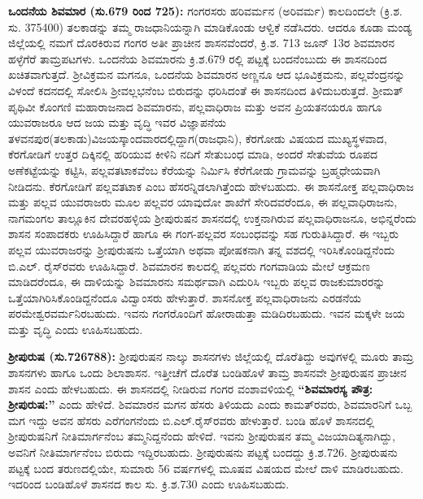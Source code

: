 \textbf{ ಒಂದನೆಯ ಶಿವಮಾರ (ಸು.679 ರಿಂದ 725): }ಗಂಗರಸರು ಹರಿವರ್ಮನ (ಅರಿವರ್ಮ) ಕಾಲದಿಂದಲೇ (ಕ್ರಿ.ಶ. ಸು. 375\enginline{-}400) ತಲಕಾಡನ್ನು ತಮ್ಮ ರಾಜಧಾನಿಯನ್ನಾಗಿ ಮಾಡಿಕೊಂಡು ಆಳ್ವಿಕೆ ನಡೆಸಿದರು. ಆದರೂ ಕೂಡಾ ಮಂಡ್ಯ ಜಿಲ್ಲೆಯಲ್ಲಿ ನಮಗೆ ದೊರಕಿರುವ ಗಂಗರ ಅತೀ ಪ್ರಾಚೀನ ಶಾಸನವೆಂದರೆ, ಕ್ರಿ.ಶ. 713 ಜೂನ್​ 13ರ ಶಿವಮಾರನ ಹಳ್ಳೆಗೆರೆ ತಾಮ್ರಪಟಗಳು. ಒಂದನೆಯ ಶಿವಮಾರನು ಕ್ರಿ.ಶ.679 ರಲ್ಲಿ ಪಟ್ಟಕ್ಕೆ ಬಂದನೆಂಬುದು ಈ ಶಾಸನದಿಂದ ಖಚಿತವಾಗುತ್ತದೆ. ಶ‍್ರೀವಿಕ್ರಮನ ಮಗನೂ, ಒಂದನೆಯ ಶಿವಮಾರನ ಅಣ್ಣನೂ ಆದ ಭೂವಿಕ್ರಮನು, ಪಲ್ಲವೆಂದ್ರನನ್ನು ವಿಳಂದೆ ಕದನದಲ್ಲಿ ಸೋಲಿಸಿ ಶ‍್ರೀವಲ್ಲಭನೆಂಬ ಬಿರುದನ್ನು ಧರಿಸಿದಂತೆ ಈ ಶಾಸನದಿಂದ ತಿಳಿದುಬರುತ್ತದೆ. ಶ‍್ರೀಮತ್​ ಪೃಥಿವೀ ಕೊಂಗಣಿ ಮಹಾರಾಜನಾದ ಶಿವಮಾರನು, ಪಲ್ಲವಾಧಿರಾಜ ಮತ್ತು ಅವನ ಪ್ರಿಯತನಯರೂ ಹಾಗೂ ಯುವರಾಜರೂ ಆದ ಜಯ ಮತ್ತು ವೃದ್ಧಿ ಇವರ ವಿಜ್ಞಾಪನೆಯ ತಳವನಪುರ(ತಲಕಾಡು)ವಿಜಯಸ್ಕಾಂದವಾರದಲ್ಲಿದ್ದಾಗ(ರಾಜಧಾನಿ), ಕೆರಗೋಡು ವಿಷಯದ ಮುಖ್ಯಸ್ಥಳವಾದ, ಕೆರಗೋಡಿಗೆ ಉತ್ತರ ದಿಕ್ಕಿನಲ್ಲಿ ಹರಿಯುವ ಕೀಳಿನಿ ನದಿಗೆ ಸೇತುಬಂಧ ಮಾಡಿ, ಅಂದರೆ ಸೇತುವೆಯ ರೂಪದ ಅಣೆಕಟ್ಟೆಯನ್ನು ಕಟ್ಟಿಸಿ, ಪಲ್ಲವತಟಾಕವೆಂಬ ಕೆರೆಯನ್ನು ನಿರ್ಮಿಸಿ ಕೆರೆಗೋಡು ಗ್ರಾಮವನ್ನು ಬ್ರಹ್ಮಧೇಯವಾಗಿ ನೀಡಿದನು. ಕೆರಗೋಡಿಗೆ ಪಲ್ಲವತಟಾಕ ಎಂಬ ಹೆಸರನ್ನಿಡಲಾಗಿತ್ತೆಂದು ಹೇಳಬಹುದು. ಈ ಶಾಸನೋಕ್ತ ಪಲ್ಲವಾಧಿರಾಜ ಮತ್ತು ಪಲ್ಲವ ಯುವರಾಜರು ಮೂಲ ಪಲ್ಲವರ ಯಾವುದೋ ಶಾಖೆಗೆ ಸೇರಿದವರೆಂದೂ, ಈ ಪಲ್ಲವಾಧಿರಾಜನು, ನಾಗಮಂಗಲ ತಾಲ್ಲೂಕಿನ ದೇವರಹಳ್ಳಿಯ ಶ‍್ರೀಪುರುಷನ ಶಾಸನದಲ್ಲಿ ಉಕ್ತನಾಗಿರುವ ಪಲ್ಲವಾಧಿರಾಜನೂ, ಅಭಿನ್ನರೆಂದು ಶಾಸನ ಸಂಪಾದಕರು ಊಹಿಸಿದ್ದಾರೆ ಹಾಗೂ ಈ ಗಂಗ-ಪಲ್ಲವರ ಸಂಬಂಧವನ್ನು ಸಹ ಗುರುತಿಸಿದ್ದಾರೆ. ಈ ಇಬ್ಬರು ಪಲ್ಲವ ಯುವರಾಜರನ್ನು ಶ‍್ರೀಪುರುಷನು ಒತ್ತೆಯಾಗಿ ಅಥವಾ ಪೋಷಕನಾಗಿ ತನ್ನ ವಶದಲ್ಲಿ ಇರಿಸಿಕೊಂಡಿದ್ದನೆಂದು ಬಿ.ಎಲ್​. ರೈಸ್​ರವರು ಊಹಿಸಿದ್ದಾರೆ. ಶಿವಮಾರನ ಕಾಲದಲ್ಲಿ ಪಲ್ಲವರು ಗಂಗವಾಡಿಯ ಮೇಲೆ ಆಕ್ರಮಣ ಮಾಡಿದರೆಂದೂ, ಈ ದಾಳಿಯನ್ನು ಶಿವಮಾರನು ಸಮರ್ಥವಾಗಿ ಎದುರಿಸಿ ಇಬ್ಬರು ಪಲ್ಲವ ರಾಜಕುಮಾರರನ್ನು ಒತ್ತೆಯಾಗಿರಿಸಿಕೊಂಡಿದ್ದನೆಂದೂ ವಿದ್ವಾಂಸರು ಹೇಳುತ್ತಾರೆ. ಶಾಸನೋಕ್ತ ಪಲ್ಲವಾಧಿರಾಜನು ಎರಡನೆಯ ಪರಮೇಶ್ವರವರ್ಮನಿರಬಹುದು. ಇವನು ಗಂಗರೊಂದಿಗೆ ಹೋರಾಡುತ್ತಾ ಮಡಿದಿರಬಹುದು. ಇವನ ಮಕ್ಕಳೇ ಜಯ ಮತ್ತು ವೃದ್ಧಿ ಎಂದು ಊಹಿಸಬಹುದು.

\textbf{ ಶ‍್ರೀಪುರುಷ (ಸು.726\general{\enginline{-}}788):} ಶ‍್ರೀಪುರುಷನ ನಾಲ್ಕು ಶಾಸನಗಳು ಜಿಲ್ಲೆಯಲ್ಲಿ ದೊರೆತಿದ್ದು ಅವುಗಳಲ್ಲಿ ಮೂರು ತಾಮ್ರ ಶಾಸನಗಳು ಹಾಗೂ ಒಂದು ಶಿಲಾಶಾಸನ. ಇತ್ತೀಚೆಗೆ ದೊರೆತ ಬಂಡಿಹೊಳೆ ತಾಮ್ರ ಶಾಸನವೇ ಶ‍್ರೀಪುರುಷನ ಪ್ರಾಚೀನ ಶಾಸನ ಎಂದು ಹೇಳಬಹುದು. ಈ ಶಾಸನದಲ್ಲಿ ನೀಡಿರುವ ಗಂಗರ ವಂಶಾವಳಿಯಲ್ಲಿ \textbf{“ಶಿವಮಾರಸ್ಯ ಪೌತ್ರ: ಶ‍್ರೀಪುರುಷ:”} ಎಂದು ಹೇಳಿದೆ. ಶಿವಮಾರನ ಮಗನ ಹೆಸರು ತಿಳಿಯದು ಎಂದು ಕಾಮತ್​ರವರು, ಶಿವಮಾರನಿಗೆ ಒಬ್ಬ ಮಗ ಇದ್ದು ಅವನ ಹೆಸರು ಎರೆಗಂಗನೆಂದು ಬಿ.ಎಲ್​.ರೈಸ್​ರವರು ಹೇಳುತ್ತಾರೆ. ಬಂಡಿ ಹೊಳೆ ಶಾಸನದಲ್ಲಿ ಶ‍್ರೀಪುರುಷನಿಗೆ ನೀತಿಮಾರ್ಗನೆಂಬ ತಮ್ಮನಿದ್ದನೆಂದು ಹೇಳಿದೆ. ಇವನು ಶ‍್ರೀಪುರುಷನ ತಮ್ಮ ವಿಜಯಾದಿತ್ಯನಾಗಿದ್ದು, ಅವನಿಗೆ ನೀತಿಮಾರ್ಗನೆಂಬ ಬಿರುದು ಇದ್ದಿರಬಹುದು. ಶ‍್ರೀಪುರುಷನು ಪಟ್ಟಕ್ಕೆ ಬಂದದ್ದು ಕ್ರಿ.ಶ.726. ಶ‍್ರೀಪುರುಷನು ಪಟ್ಟಕ್ಕೆ ಬಂದ ತರುಣದಲ್ಲಿಯೇ, ಸುಮಾರು 5\enginline{-}6 ವರ್ಷಗಳಲ್ಲಿ ಮೂಷವ ವಿಷಯದ ಮೇಲೆ ದಾಳಿ ಮಾಡಿರಬಹುದು. ಇದರಿಂದ ಬಂಡಿಹೊಳೆ ಶಾಸನದ ಕಾಲ ಸು. ಕ್ರಿ.ಶ.730 ಎಂದು ಊಹಿಸಬಹುದು.

